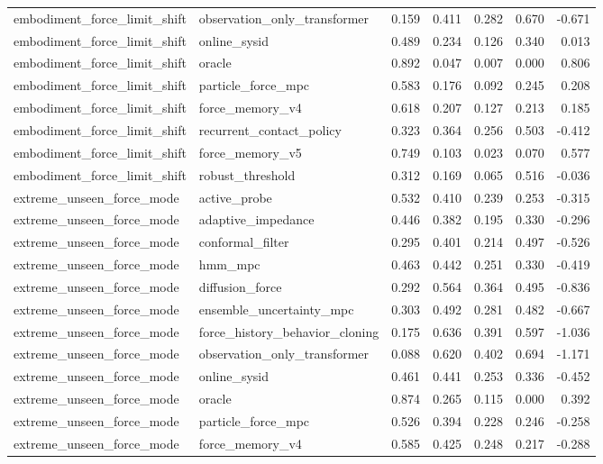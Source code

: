 \documentclass{article}
\begin{document}
\begin{longtable}{llrrrrr}
embodiment\_force\_limit\_shift & observation\_only\_transformer & 0.159 & 0.411 & 0.282 & 0.670 & -0.671 \\
embodiment\_force\_limit\_shift & online\_sysid & 0.489 & 0.234 & 0.126 & 0.340 & 0.013 \\
embodiment\_force\_limit\_shift & oracle & 0.892 & 0.047 & 0.007 & 0.000 & 0.806 \\
embodiment\_force\_limit\_shift & particle\_force\_mpc & 0.583 & 0.176 & 0.092 & 0.245 & 0.208 \\
embodiment\_force\_limit\_shift & force\_memory\_v4 & 0.618 & 0.207 & 0.127 & 0.213 & 0.185 \\
embodiment\_force\_limit\_shift & recurrent\_contact\_policy & 0.323 & 0.364 & 0.256 & 0.503 & -0.412 \\
embodiment\_force\_limit\_shift & force\_memory\_v5 & 0.749 & 0.103 & 0.023 & 0.070 & 0.577 \\
embodiment\_force\_limit\_shift & robust\_threshold & 0.312 & 0.169 & 0.065 & 0.516 & -0.036 \\
extreme\_unseen\_force\_mode & active\_probe & 0.532 & 0.410 & 0.239 & 0.253 & -0.315 \\
extreme\_unseen\_force\_mode & adaptive\_impedance & 0.446 & 0.382 & 0.195 & 0.330 & -0.296 \\
extreme\_unseen\_force\_mode & conformal\_filter & 0.295 & 0.401 & 0.214 & 0.497 & -0.526 \\
extreme\_unseen\_force\_mode & hmm\_mpc & 0.463 & 0.442 & 0.251 & 0.330 & -0.419 \\
extreme\_unseen\_force\_mode & diffusion\_force & 0.292 & 0.564 & 0.364 & 0.495 & -0.836 \\
extreme\_unseen\_force\_mode & ensemble\_uncertainty\_mpc & 0.303 & 0.492 & 0.281 & 0.482 & -0.667 \\
extreme\_unseen\_force\_mode & force\_history\_behavior\_cloning & 0.175 & 0.636 & 0.391 & 0.597 & -1.036 \\
extreme\_unseen\_force\_mode & observation\_only\_transformer & 0.088 & 0.620 & 0.402 & 0.694 & -1.171 \\
extreme\_unseen\_force\_mode & online\_sysid & 0.461 & 0.441 & 0.253 & 0.336 & -0.452 \\
extreme\_unseen\_force\_mode & oracle & 0.874 & 0.265 & 0.115 & 0.000 & 0.392 \\
extreme\_unseen\_force\_mode & particle\_force\_mpc & 0.526 & 0.394 & 0.228 & 0.246 & -0.258 \\
extreme\_unseen\_force\_mode & force\_memory\_v4 & 0.585 & 0.425 & 0.248 & 0.217 & -0.288 \\

\end{longtable}
\end{document}
